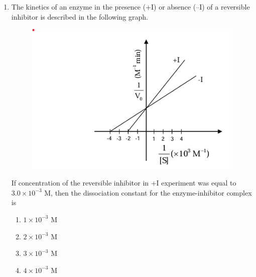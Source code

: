 \documentclass[journal,12pt,onecolumn]{IEEEtran}
\begin{document}
\begin{enumerate}[label=\arabic*.]
\item The kinetics of an enzyme in the presence (+I) or absence (–I) of a reversible inhibitor is described in the following graph.

\begin{figure}[H]
    \centering
    \includegraphics[width=0.7\columnwidth]{FIG/I-19.png}
    \caption*{}
    \label{fig:I-19}
\end{figure}

If concentration of the reversible inhibitor in +I experiment was equal to $3.0 \times 10^{-3}$ M, then the dissociation constant for the enzyme-inhibitor complex is\\

\begin{multicols}{2}
\begin{enumerate}[label=(\Alph*)]
\item $1 \times 10^{-3}$ M
\item $2 \times 10^{-3}$ M
\item $3 \times 10^{-3}$ M
\item $4 \times 10^{-3}$ M
\end{enumerate}
\end{multicols}


\end{enumerate}
\end{document}
